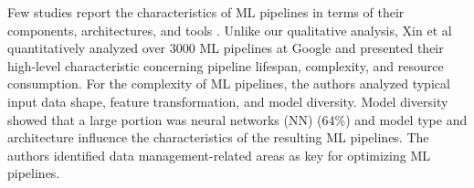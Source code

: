 Few studies report the characteristics of ML pipelines in terms of their components, architectures, and tools \cite{Hummer2019IBM,Doris2021MLPipelines}. Unlike our qualitative analysis, Xin et al \cite{Doris2021MLPipelines} quantitatively analyzed over 3000 ML pipelines at Google and presented their high-level characteristic concerning pipeline lifespan, complexity, and resource consumption. For the complexity of ML pipelines, the authors analyzed typical input data shape, feature transformation, and model diversity. Model diversity showed that a large portion was neural networks (NN) (64\%) and model type and architecture influence the characteristics of the resulting ML pipelines. The authors \cite{Doris2021MLPipelines} identified data management-related areas as key for optimizing ML pipelines.